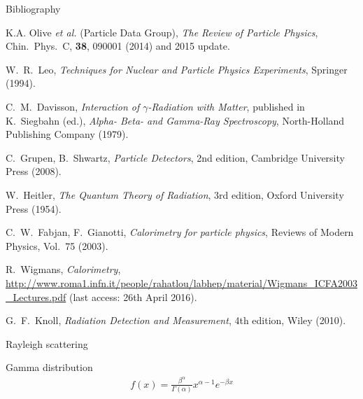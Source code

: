 \documentclass[11pt,xcolor=dvipsnames,professionalfonts]{beamer}
\newcommand{\beginbackup}{
	\newcounter{framenumbervorappendix}
	\setcounter{framenumbervorappendix}{\value{framenumber}}
}
\newcommand{\backupend}{
	\addtocounter{framenumbervorappendix}{-\value{framenumber}}
	\addtocounter{framenumber}{\value{framenumbervorappendix}} 
}
\begin{document}
\begin{frame}{Bibliography}
	\scriptsize
	\begin{thebibliography}{9}
			K.A. Olive \textit{et al.} (Particle Data Group),
			\emph{The Review of Particle Physics},
			Chin.\ Phys.\ C, \textbf{38}, 090001 (2014) and 2015 update.
		
			W.\ R.\ Leo,
			\emph{Techniques for Nuclear and Particle Physics Experiments},
			Springer (1994).
		
			C.\ M.\ Davisson,
			\emph{Interaction of $\gamma$-Radiation with Matter},
			published in K.\ Siegbahn (ed.),
			\emph{Alpha- Beta- and Gamma-Ray Spectroscopy}, North-Holland Publishing Company (1979).
		
			C.\ Grupen, B.\ Shwartz,
			\emph{Particle Detectors},
			2nd edition,
			Cambridge University Press (2008).
		
			W.\ Heitler,
			\emph{The Quantum Theory of Radiation},
			3rd edition, Oxford University Press (1954).
		
			C.\ W.\ Fabjan, F.\ Gianotti,
			\emph{Calorimetry for particle physics},
			Reviews of Modern Physics, Vol.\ 75 (2003).
		
			R.\ Wigmans,
			\emph{Calorimetry},
			\url{http://www.roma1.infn.it/people/rahatlou/labhep/material/Wigmans_ICFA2003_Lectures.pdf} (last access: 26th April 2016).
		
			G.\ F.\ Knoll,
			\emph{Radiation Detection and Measurement},
			4th edition, Wiley (2010).
	\end{thebibliography}
\end{frame}

\beginbackup

\begin{frame}{Rayleigh scattering}
\end{frame}

\begin{frame}{Gamma distribution}
	\begin{align*}
		f(x) = \frac{\beta^\alpha}{\Gamma(\alpha)} x^{\alpha - 1} e^{-\beta x}
	\end{align*}
\end{frame}

\backupend
\end{document}
